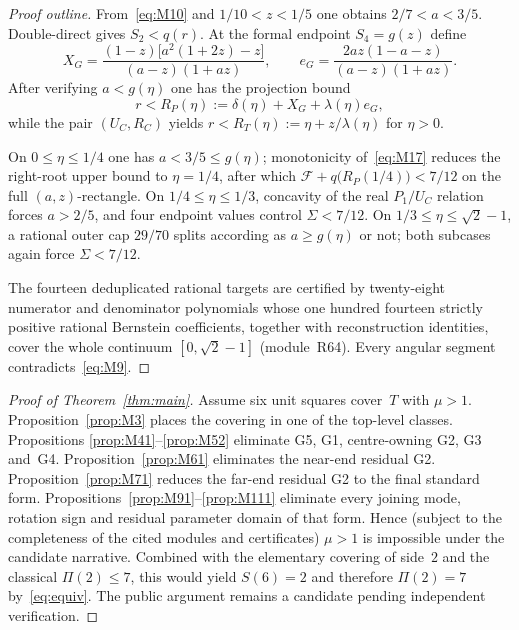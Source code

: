\documentclass[11pt,reqno]{amsart}
\theoremstyle{definition}
\begin{document}
\begin{proof}[Proof outline]
From~\eqref{eq:M10} and $1/10<z<1/5$ one obtains $2/7<a<3/5$.  Double-direct
gives $S_2<q(r)$.  At the formal endpoint $S_4=g(z)$ define
\begin{equation}\label{eq:M16}
X_G=\frac{(1-z)\bigl[a^2(1+2z)-z\bigr]}{(a-z)(1+az)},\qquad
e_G=\frac{2az(1-a-z)}{(a-z)(1+az)}.
\end{equation}
After verifying $a<g(\eta)$ one has the projection bound
\begin{equation}\label{eq:M17}
r<R_P(\eta):=\delta(\eta)+X_G+\lambda(\eta)e_G,
\end{equation}
while the pair $(U_C,R_C)$ yields $r<R_T(\eta):=\eta+z/\lambda(\eta)$ for $\eta>0$.

On $0\le \eta\le 1/4$ one has $a<3/5\le g(\eta)$; monotonicity of~\eqref{eq:M17}
reduces the right-root upper bound to $\eta=1/4$, after which
$\mathcal F+q\bigl(R_P(1/4)\bigr)<7/12$ on the full $(a,z)$-rectangle.
On $1/4\le \eta\le 1/3$, concavity of the real $P_1/U_C$ relation forces $a>2/5$,
and four endpoint values control $\Sigma<7/12$.  On
$1/3\le \eta\le\sqrt2-1$, a rational outer cap $29/70$ splits according as
$a\ge g(\eta)$ or not; both subcases again force $\Sigma<7/12$.

The fourteen deduplicated rational targets are certified by twenty-eight
numerator and denominator polynomials whose one hundred fourteen strictly positive
rational Bernstein coefficients, together with reconstruction identities, cover
the whole continuum $[0,\sqrt2-1]$ (module~R64).  Every angular segment
contradicts~\eqref{eq:M9}.
\end{proof}

\begin{proof}[Proof of Theorem~\ref{thm:main}]
Assume six unit squares cover~$T$ with $\mu>1$.  Proposition~\ref{prop:M3}
places the covering in one of the top-level classes.  Propositions
\ref{prop:M41}--\ref{prop:M52} eliminate G5, G1, centre-owning G2, G3 and~G4.
Proposition~\ref{prop:M61} eliminates the near-end residual G2.
Proposition~\ref{prop:M71} reduces the far-end residual G2 to the final
standard form.  Propositions~\ref{prop:M91}--\ref{prop:M111} eliminate every
joining mode, rotation sign and residual parameter domain of that form.
Hence (subject to the completeness of the cited modules and certificates)
$\mu>1$ is impossible under the candidate narrative.  Combined with the
elementary covering of side~$2$ and the classical $\Pi(2)\le 7$, this would
yield $S(6)=2$ and therefore $\Pi(2)=7$ by~\eqref{eq:equiv}.  The public
argument remains a candidate pending independent verification.
\end{proof}
\end{document}

